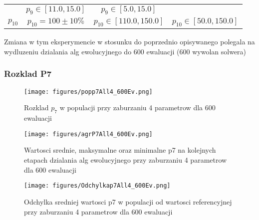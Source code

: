 \documentclass[]{article}
\begin{document}
\begin{longtable}[c]{@{}lccc@{}}
\begin{minipage}[t]{0.26\columnwidth}
\strut\end{minipage} &
\begin{minipage}[t]{0.24\columnwidth}\centering\strut
\(p_9 \in [11.0,15.0]\)
\strut\end{minipage} &
\begin{minipage}[t]{0.26\columnwidth}\centering\strut
\(p_9 \in [5.0,15.0]\)
\strut\end{minipage}\tabularnewline
\begin{minipage}[t]{0.13\columnwidth}\raggedright\strut
\(p_{10}\)
\strut\end{minipage} &
\begin{minipage}[t]{0.26\columnwidth}\centering\strut
\(p_{10} = 100 \pm 10 \%\)
\strut\end{minipage} &
\begin{minipage}[t]{0.24\columnwidth}\centering\strut
\(p_{10} \in [110.0,150.0]\)
\strut\end{minipage} &
\begin{minipage}[t]{0.26\columnwidth}\centering\strut
\(p_{10} \in [50.0,150.0]\)
\strut\end{minipage}\tabularnewline
\bottomrule
\end{longtable}

Zmiana w tym eksperymencie w stosunku do poprzednio opisywanego polegala
na wydluzeniu dzialania alg ewolucyjnego do 600 ewaluacji (600 wywolan
solwera)

\subsubsection{Rozklad P7}\label{rozklad-p7-1}

\begin{figure}[htbp]
\centering
\texttt{[image: figures/popp7All4\_600Ev.png]}
\caption{Rozklad \(p_7\) w populacji przy zaburzaniu 4 parametrow dla
600 ewaluacji}
\end{figure}

\begin{figure}[htbp]
\centering
\texttt{[image: figures/agrP7All4\_600Ev.png]}
\caption{Wartosci srednie, maksymalne oraz minimalne p7 na kolejnych
etapach dzialania alg ewolucyjnego przy zaburzaniu 4 parametrow dla 600
ewaluacji}
\end{figure}

\begin{figure}[htbp]
\centering
\texttt{[image: figures/Odchylkap7All4\_600Ev.png]}
\caption{Odchylka sredniej wartosci p7 w populacji od wartosci
referencyjnej przy zaburzaniu 4 parametrow dla 600 ewaluacji}
\end{figure}
\end{document}
